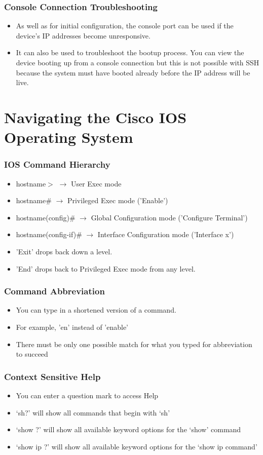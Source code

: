 \documentclass[pdflatex,compress]{beamer}
\begin{document}
\begin{frame}
	\frametitle{Console Connection Troubleshooting}
	\begin{itemize}
		\item As well as for initial configuration, the console port can be used if the device’s IP addresses become unresponsive.
		\item It can also be used to troubleshoot the bootup process. You can view the device booting up from a console connection but this is not possible with SSH because the system must have booted already before the IP address will be live.
	\end{itemize}
\end{frame}

\section{Navigating the Cisco IOS Operating System}

\begin{frame}
	\frametitle{IOS Command Hierarchy}
	\begin{itemize}
		\item hostname$ > $ $\rightarrow$ User Exec mode
		\item hostname$ \# $ $\rightarrow$ Privileged Exec mode ('Enable')
		\item hostname(config)$ \# $ $\rightarrow$ Global Configuration mode ('Configure Terminal')
		\item hostname(config-if)$ \# $ $\rightarrow$ Interface Configuration mode ('Interface x')
		\item 'Exit' drops back down a level.
		\item 'End' drops back to Privileged Exec mode from any level.
	\end{itemize}
\end{frame}

\begin{frame}
	\frametitle{Command Abbreviation}
	\begin{itemize}
		\item You can type in a shortened version of a command.
		\item For example, 'en' instead of 'enable'
		\item There must be only one possible match for what you typed for abbreviation to succeed
	\end{itemize}
\end{frame}

\begin{frame}
	\frametitle{Context Sensitive Help}
	\begin{itemize}
		\item You can enter a question mark to access Help
		\item ‘sh?’ will show all commands that begin with ‘sh’
		\item ‘show ?’ will show all available keyword options for the ‘show’ command
		\item ‘show ip ?’ will show all available keyword options for the ‘show ip command’
	\end{itemize}
\end{frame}
\end{document}
